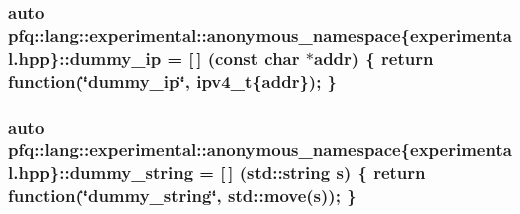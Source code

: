 \subsubsection[{\texorpdfstring{dummy\+\_\+ip}{dummy_ip}}]{\setlength{\rightskip}{0pt plus 5cm}auto pfq\+::lang\+::experimental\+::anonymous\+\_\+namespace\{experimental.\+hpp\}\+::dummy\+\_\+ip = \mbox{[}$\,$\mbox{]} (const char $\ast$addr) \{ return {\bf function}(\char`\"{}dummy\+\_\+ip\char`\"{}, ipv4\+\_\+t\{addr\}); \}}\hypertarget{namespacepfq_1_1lang_1_1experimental_1_1anonymous__namespace_02experimental_8hpp_03_abc66a4fd883f91bb1fd0d4d369b2499c}{}\label{namespacepfq_1_1lang_1_1experimental_1_1anonymous__namespace_02experimental_8hpp_03_abc66a4fd883f91bb1fd0d4d369b2499c}
\subsubsection[{\texorpdfstring{dummy\+\_\+string}{dummy_string}}]{\setlength{\rightskip}{0pt plus 5cm}auto pfq\+::lang\+::experimental\+::anonymous\+\_\+namespace\{experimental.\+hpp\}\+::dummy\+\_\+string = \mbox{[}$\,$\mbox{]} (std\+::string s) \{ return {\bf function}(\char`\"{}dummy\+\_\+string\char`\"{}, std\+::move(s)); \}}\hypertarget{namespacepfq_1_1lang_1_1experimental_1_1anonymous__namespace_02experimental_8hpp_03_a354cb0bfb9d9033e9d87f03fba7c7267}{}\label{namespacepfq_1_1lang_1_1experimental_1_1anonymous__namespace_02experimental_8hpp_03_a354cb0bfb9d9033e9d87f03fba7c7267}
